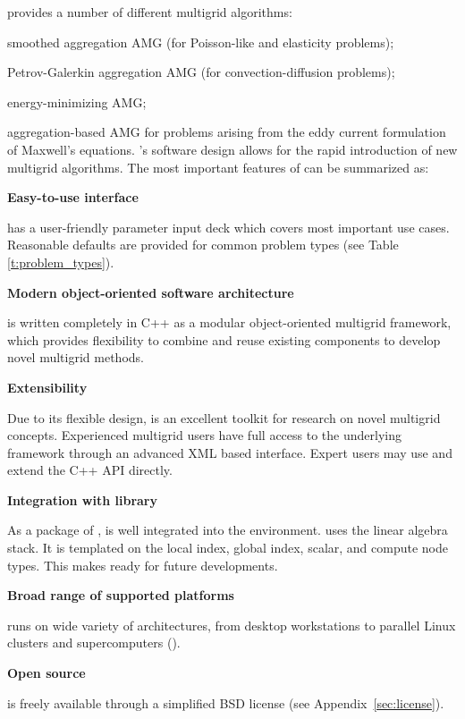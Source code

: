 \muelu{} provides a number of different multigrid algorithms:
\be
  \item smoothed aggregation AMG (for Poisson-like and elasticity problems);
  \item Petrov-Galerkin aggregation AMG (for convection-diffusion problems);
  \item energy-minimizing AMG;
  \item aggregation-based AMG for problems arising from the eddy current
    formulation of Maxwell's equations.
\ee
\muelu's software design allows for the rapid introduction of new multigrid algorithms.
The most important features of \muelu{} can be summarized as:
\begin{description}
  \item \textbf{Easy-to-use interface}

    \muelu{} has a user-friendly parameter input deck which covers
    most important use cases.  Reasonable defaults are provided for common problem types
    (see Table \ref{t:problem_types}).

  \item \textbf{Modern object-oriented software architecture}

    \muelu{} is written completely in C++ as a modular object-oriented multigrid
    framework, which provides flexibility to combine and reuse existing
    components to develop novel multigrid methods.

  \item \textbf{Extensibility}

    Due to its flexible design, \muelu{} is an excellent toolkit for
    research on novel multigrid concepts. Experienced multigrid users have full
    access to the underlying framework through an advanced XML based interface.
    Expert users may use and extend the C++ API directly.

  \item \textbf{Integration with \trilinos{} library}

    As a package of \trilinos, \muelu{} is well integrated into the \trilinos
    environment. \muelu{} uses the \tpetra{} linear algebra stack. It is
    templated on the local index, global index, scalar, and compute node types.
    This makes \muelu{} ready for future developments.

  \item \textbf{Broad range of supported platforms}

    \muelu{} runs on wide variety of architectures, from desktop workstations to
    parallel Linux clusters and supercomputers (\cite{lin2014}).

  \item \textbf{Open source}

    \muelu{} is freely available through a simplified BSD license (see Appendix~\ref{sec:license}).
\end{description}

